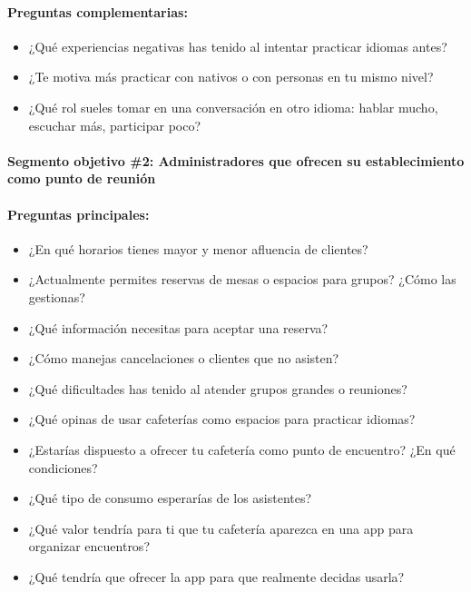 \paragraph{Preguntas
complementarias:}\label{report__20-cap2-requirements-analysis.md__preguntas-complementarias}

\begin{itemize}
\tightlist
\item
  ¿Qué experiencias negativas has tenido al intentar practicar idiomas
  antes?
\item
  ¿Te motiva más practicar con nativos o con personas en tu mismo nivel?
\item
  ¿Qué rol sueles tomar en una conversación en otro idioma: hablar
  mucho, escuchar más, participar poco?
\end{itemize}

\paragraph{Segmento objetivo \#2: Administradores que ofrecen su
establecimiento como punto de
reunión}\label{report__20-cap2-requirements-analysis.md__segmento-objetivo-2-administradores-que-ofrecen-su-establecimiento-como-punto-de-reuniuxf3n}

\paragraph{Preguntas
principales:}\label{report__20-cap2-requirements-analysis.md__preguntas-principales-1}

\begin{itemize}
\tightlist
\item
  ¿En qué horarios tienes mayor y menor afluencia de clientes?
\item
  ¿Actualmente permites reservas de mesas o espacios para grupos? ¿Cómo
  las gestionas?
\item
  ¿Qué información necesitas para aceptar una reserva?
\item
  ¿Cómo manejas cancelaciones o clientes que no asisten?
\item
  ¿Qué dificultades has tenido al atender grupos grandes o reuniones?
\item
  ¿Qué opinas de usar cafeterías como espacios para practicar idiomas?
\item
  ¿Estarías dispuesto a ofrecer tu cafetería como punto de encuentro?
  ¿En qué condiciones?
\item
  ¿Qué tipo de consumo esperarías de los asistentes?
\item
  ¿Qué valor tendría para ti que tu cafetería aparezca en una app para
  organizar encuentros?
\item
  ¿Qué tendría que ofrecer la app para que realmente decidas usarla?
\end{itemize}

